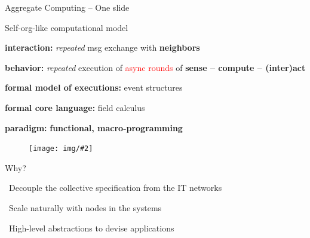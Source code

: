\documentclass[presentation, 8pt,169]{beamer}\mode<presentation>{\usetheme{AMSBolognaFC}}
\newcommand{\hsplit}[2]{
\begin{minipage}{0.48\textwidth}
#1
\end{minipage}
\hfill
\begin{minipage}{0.48\textwidth}
#2
\end{minipage}
}
\newcommand{\lbl}[1]{\textbf{\textcolor{gray!90!white}{#1}}}
\newcommand{\enf}[1]{{\textcolor{red}{#1}}}
\newcommand{\bo}[1]{\textbf{#1}}
\newcommand{\imgv}[2]{
\begin{figure}
\centering
\texttt{[image: img/\#2]}
\end{figure}
}
\begin{document}
\begin{frame}{Aggregate Computing -- One slide}
  \hsplit{

  \begin{block}{\footnotesize Self-org-like computational model}
  \scriptsize
  
  \lbl{interaction:} \emph{repeated} msg exchange with \bo{neighbors}\vspace{0.1cm}
  
  \lbl{behavior:} \emph{repeated} execution of \enf{async rounds} of \bo{sense -- compute -- (inter)act} \vspace{0.1cm}
  
  
  \lbl{formal model of executions:} event structures \vspace{0.1cm}
  
  \end{block}
  
  \begin{block}{}
  \scriptsize
  
  \lbl{formal core language:} field calculus~\cite{vbdacp:ac:survey:jlamp}\vspace{0.1cm}
  
  \lbl{paradigm:} \bo{functional, macro-programming} \vspace{0.1cm} %
  
  \centering
  \imgv{0.22}{channel.pdf}
  \end{block}
  
  }{
  \begin{block}{\footnotesize Why?}
    \scriptsize
    
    {\bold{\faThumbsUp}} \, Decouple the collective specification from the IT networks  \vspace{0.1cm}
    
    {\bold{\faThumbsUp}} \, Scale naturally with nodes in the systems  \vspace{0.1cm}
     
    {\bold{\faThumbsUp}} \, High-level abstractions to devise applications
    
  \end{block}
  
}
\end{frame}
\end{document}
